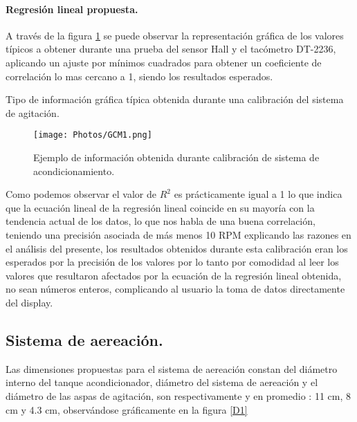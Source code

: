 \documentclass[11pt,letter
								]
								{article}
\begin{document}
			\paragraph {Regresión lineal propuesta.}

A través de la figura \ref{CalM1} se puede observar la representación gráfica de los   valores típicos  a obtener  durante una prueba del sensor Hall y el tacómetro DT-2236, aplicando un ajuste por mínimos cuadrados  para obtener un coeficiente de correlación lo mas cercano  a 1, siendo los resultados esperados.



        Tipo de información gráfica típica obtenida durante una calibración del sistema de agitación.

\begin{figure}[H]
\centering
\texttt{[image: Photos/GCM1.png]}
\caption{ Ejemplo de información obtenida durante calibración de sistema de acondicionamiento. }
\label{CalM1}
\end{figure}






%
Como podemos observar el valor de $R^{2}$ es prácticamente igual a 1 lo que indica que la ecuación lineal de la  regresión lineal coincide en su mayoría con la tendencia actual de los datos, lo que nos habla de una buena correlación, teniendo una precisión  asociada de más menos 10 RPM explicando las razones en el análisis del presente, los resultados obtenidos durante esta calibración eran los esperados por la precisión de los valores por lo tanto por comodidad al leer los valores que resultaron afectados por la ecuación de la regresión lineal obtenida, no sean números enteros, complicando  al usuario la toma de datos directamente del display.   



		\subsection{Sistema de aereación.}
Las dimensiones propuestas para el sistema de aereación   constan del diámetro interno del tanque acondicionador, diámetro del sistema de aereación y el diámetro de las aspas de agitación, son respectivamente y en promedio : 11 cm, 8 cm y 4.3 cm, observándose gráficamente en la figura \ref{D1}
\end{document}
